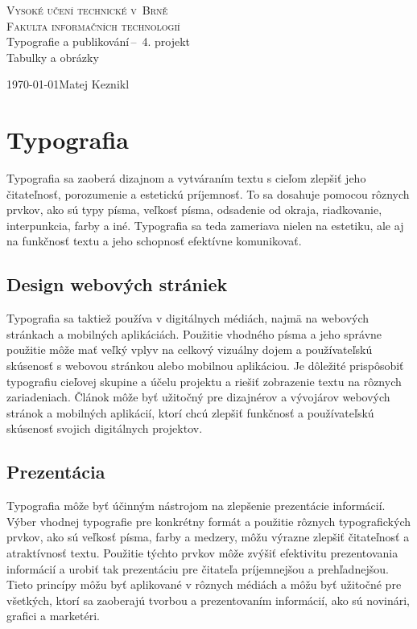 \documentclass[a4paper, 11pt]{article}
\begin{document}
\begin{titlepage}
	\begin{center} 
		\textsc{\Huge Vysoké učení technické v~Brně\\
			\huge Fakulta informačních technologií \\}
			\LARGE Typografie a publikování\,--\ 4. projekt\\
			\Huge Tabulky a obrázky
			\end{center}
			\Large \today \hfill Matej Keznikl
\end{titlepage}


\section{Typografia}
Typografia sa zaoberá dizajnom a vytváraním textu s cieľom zlepšiť jeho čitateľnosť, porozumenie a estetickú príjemnosť. To sa dosahuje pomocou rôznych prvkov, ako sú typy písma, veľkosť písma, odsadenie od okraja, riadkovanie, interpunkcia, farby a iné. Typografia sa teda zameriava nielen na estetiku, ale aj na funkčnosť textu a jeho schopnosť efektívne komunikovať. \cite{KNUTH}


\subsection{Design webových strániek}
Typografia sa taktiež používa v digitálnych médiách, najmä na webových stránkach a mobilných aplikáciách. Použitie vhodného písma a jeho správne použitie môže mať veľký vplyv na celkový vizuálny dojem a používateľskú skúsenosť s webovou stránkou alebo mobilnou aplikáciou. Je dôležité prispôsobiť typografiu cieľovej skupine a účelu projektu a riešiť zobrazenie textu na rôznych zariadeniach. Článok môže byť užitočný pre dizajnérov a vývojárov webových stránok a mobilných aplikácií, ktorí chcú zlepšiť funkčnosť a používateľskú skúsenosť svojich digitálnych projektov. \cite{WebsiteDesign}


\subsection{Prezentácia}
Typografia môže byť účinným nástrojom na zlepšenie prezentácie informácií. Výber vhodnej typografie pre konkrétny formát a použitie rôznych typografických prvkov, ako sú veľkosť písma, farby a medzery, môžu výrazne zlepšiť čitateľnosť a atraktívnosť textu. Použitie týchto prvkov môže zvýšiť efektivitu prezentovania informácií a urobiť tak prezentáciu pre čitateľa príjemnejšou a prehľadnejšou. Tieto princípy môžu byť aplikované v rôznych médiách a môžu byť užitočné pre všetkých, ktorí sa zaoberajú tvorbou a prezentovaním informácií, ako sú novinári, grafici a marketéri. \cite{NovotnaMaria2019}
\end{document}
